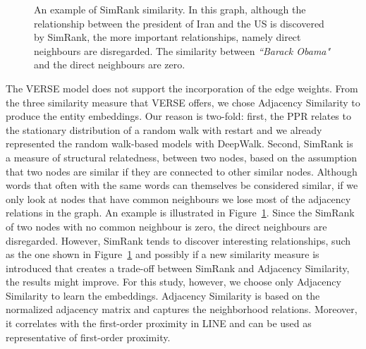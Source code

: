 \begin{figure}
\centering 
\resizebox{0.50\textwidth}{0.35\textwidth}{      

}
\caption{An example of SimRank similarity. In this graph, although the relationship between the president of Iran and the US is discovered by SimRank, the more important relationships, namely direct neighbours are disregarded. The similarity between \emph{``Barack Obama"} and the direct neighbours are zero.}
\label{fig:simrank}
\end{figure}
\noindent
The VERSE model does not support the incorporation of the edge weights. From the three similarity measure that VERSE offers, we chose Adjacency Similarity to produce the entity embeddings. Our reason is two-fold: first, the PPR relates to the stationary distribution of a random walk with restart and we already represented the random walk-based models with DeepWalk.
Second, SimRank is a measure of structural relatedness, between two nodes, based on the assumption that two nodes are similar if they are connected to other similar nodes. Although words that  often with the same words can themselves be considered similar, if we only look at nodes that have common neighbours we lose most of the adjacency relations in the graph. An example is illustrated in Figure~\ref{fig:simrank}. Since the SimRank of two nodes with no common neighbour is zero, the direct neighbours are disregarded. However, SimRank tends to discover interesting relationships, such as the one shown in Figure~\ref{fig:simrank} and possibly if a new similarity measure is introduced that creates a trade-off between SimRank and Adjacency Similarity, the results might improve. For this study, however, we choose only Adjacency Similarity to learn the embeddings.
Adjacency Similarity is based on the normalized adjacency matrix and captures the neighborhood relations.
Moreover, it correlates with the first-order proximity in LINE and can be used as representative of first-order proximity. 
